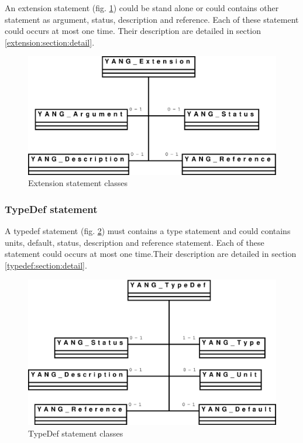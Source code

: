 \documentclass[a4paper]{article}
\begin{document}
An extension statement (fig.  \ref{extension}) could be stand alone or
could contains  other statement  as argument, status,  description and
reference.  Each   of  these  statement  could  occurs   at  most  one
time.     Their     description     are     detailed     in     section
\ref{extension:section:detail}.
\begin{figure}[htbp]
\begin{center}
\includegraphics[scale = .3]{extension.eps}
\end{center}
\caption{Extension statement classes}
\label{extension}
\end{figure}

\subsubsection{TypeDef statement}
\label{typedef:section:global}

A  typedef  statement  (fig.   \ref{typedef})  must  contains  a  type
statement and  could contains  units, default, status,  description and
reference statement. Each of these  statement could occurs at most one
time.Their     description     are     detailed     in     section
\ref{typedef:section:detail}.
\begin{figure}[htbp]
\begin{center}
\includegraphics[scale = .3]{typedef.eps}
\end{center}
\caption{TypeDef statement classes}
\label{typedef}
\end{figure}
\end{document}
